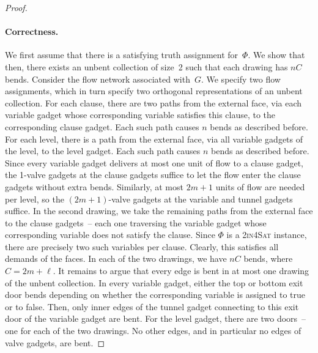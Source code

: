 \documentclass[runningheads]{llncs}
\begin{document}
\begin{proof}
    \paragraph{Correctness.}    
    We first assume that there is a satisfying truth assignment for~$\Phi$.
    We show that then, there exists an unbent collection of size~2
    such that each drawing has $n C$ bends.
    Consider the flow network associated with~$G$.
    We specify two flow assignments, which in turn specify two
    orthogonal representations
    of an unbent collection.
    For each clause, there are two paths from the
    external face, via each variable gadget whose corresponding variable
    satisfies this clause, to the corresponding clause gadget.
    Each such path causes $n$ bends as described before.
    For each level, there is a path from the external face,
    via all variable gadgets of the level, to the level gadget.
    Each such path causes $n$ bends as described before.
    Since every variable gadget delivers at most one unit
    of flow to a clause gadget, the 1-valve gadgets at the
    clause gadgets suffice
    to let the flow enter the clause gadgets
    without extra bends.
    Similarly, at most $2m + 1$ units of flow are needed per level,
    so the $(2m+1)$-valve gadgets at the variable and tunnel gadgets suffice.
    In the second drawing, we take the remaining paths
    from the external face to the clause gadgets~-- each one
    traversing the variable gadget whose corresponding variable
    does not satisfy the clause.
    Since $\Phi$ is a \textsc{2in4Sat} instance,
    there are precisely two such variables per clause.
    Clearly, this satisfies all demands of the faces.
    In each of the two drawings, we have $n C$ bends, where $C = 2 m + \ell$.
    It remains to argue that every edge is bent in at most one
    drawing of the unbent collection.
    In every variable gadget, either the top or bottom exit door
    bends depending on whether the corresponding variable
    is assigned to true or to false.
    Then, only inner edges of the tunnel gadget
    connecting to this exit door of the variable gadget are bent.
    For the level gadget, there are two doors~-- one for each of the two drawings.
    No other edges, and in particular no edges of valve gadgets, are bent.
    

\end{proof}
\end{document}
